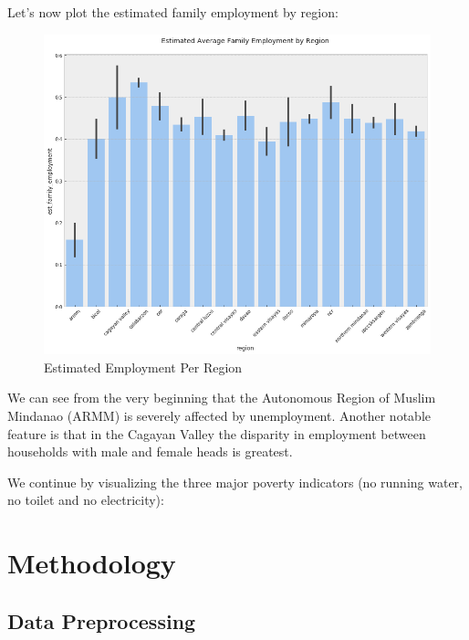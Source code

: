 \documentclass{article}
\begin{document}
Let's now plot the estimated family employment by region:

\begin{figure}[h]
\caption{Estimated Employment Per Region}
\centering
\includegraphics[width = 0.8 \textwidth]{empl_region}
\end{figure}

We can see from the very beginning that the Autonomous Region of Muslim Mindanao (ARMM) is severely affected by unemployment. Another notable feature is that in the Cagayan Valley the disparity in employment between households with male and female heads is greatest.

We continue by visualizing the three major poverty indicators (no running water, no toilet and no electricity):



\section{Methodology}
\hypertarget{data_prep}{\subsection{Data Preprocessing}}
\end{document}
